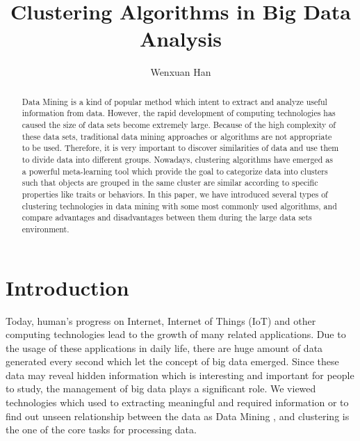 \documentclass[sigconf]{acmart}
\begin{document}
\title{Clustering Algorithms in Big Data Analysis}


\author{Wenxuan Han}




\begin{abstract}
Data Mining is a kind of popular method which intent to extract and analyze useful information from data. However, the rapid development of computing technologies has caused the size of data sets become extremely large. Because of the high complexity of these data sets, traditional data mining approaches or algorithms are not appropriate to be used. Therefore, it is very important to discover similarities of data and use them to divide data into different groups. Nowadays, clustering algorithms have emerged as a powerful meta-learning tool which provide the goal to categorize data into clusters such that objects are grouped in the same cluster are similar according to specific properties like traits or behaviors. In this paper, we have introduced several types of clustering technologies in data mining with some most commonly used algorithms, and compare advantages and disadvantages between them during the large data sets environment.
\end{abstract}



\maketitle



\section{Introduction}

Today, human's progress on Internet, Internet of Things (IoT) and other computing technologies lead to the growth of many related applications. Due to the usage of these applications in daily life, there are huge amount of data generated every second which let the concept of big data emerged. Since these data may reveal hidden information which is interesting and important for people to study, the management of big data plays a significant role. We viewed technologies which used to extracting meaningful and required information or to find out unseen relationship between the data as Data Mining \cite{dcar}, and clustering is the one of the core tasks for processing data.
\end{document}
